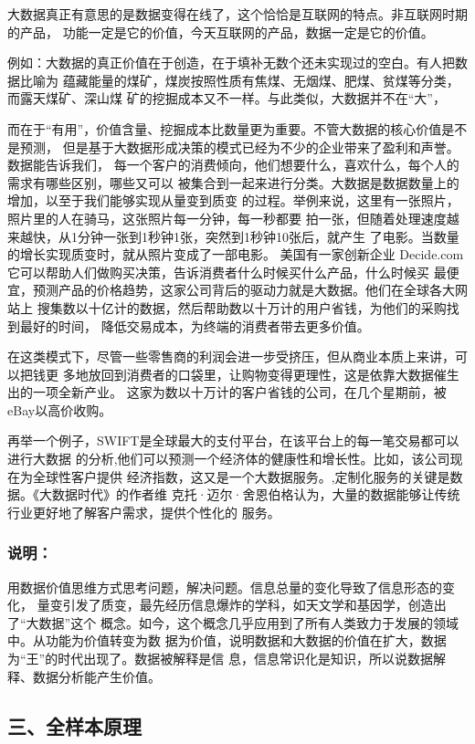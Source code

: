 \documentclass[11pt]{ctexart}
\begin{document}
{{{{大数据真正有意思的是数据变得在线了，这个恰恰是互联网的特点。非互联网时期的产品，
功能一定是它的价值，今天互联网的产品，数据一定是它的价值。

例如：大数据的真正价值在于创造，在于填补无数个还未实现过的空白。有人把数据比喻为
蕴藏能量的煤矿，煤炭按照性质有焦煤、无烟煤、肥煤、贫煤等分类，而露天煤矿、深山煤
矿的挖掘成本又不一样。与此类似，大数据并不在“大”，

而在于“有用”，价值含量、挖掘成本比数量更为重要。不管大数据的核心价值是不是预测，
但是基于大数据形成决策的模式已经为不少的企业带来了盈利和声誉。   数据能告诉我们，
每一个客户的消费倾向，他们想要什么，喜欢什么，每个人的需求有哪些区别，哪些又可以
被集合到一起来进行分类。大数据是数据数量上的增加，以至于我们能够实现从量变到质变
的过程。举例来说，这里有一张照片，照片里的人在骑马，这张照片每一分钟，每一秒都要
拍一张，但随着处理速度越来越快，从1分钟一张到1秒钟1张，突然到1秒钟10张后，就产生
了电影。当数量的增长实现质变时，就从照片变成了一部电影。   美国有一家创新企业
Decide.com   它可以帮助人们做购买决策，告诉消费者什么时候买什么产品，什么时候买
最便宜，预测产品的价格趋势，这家公司背后的驱动力就是大数据。他们在全球各大网站上
搜集数以十亿计的数据，然后帮助数以十万计的用户省钱，为他们的采购找到最好的时间，
降低交易成本，为终端的消费者带去更多价值。

在这类模式下，尽管一些零售商的利润会进一步受挤压，但从商业本质上来讲，可以把钱更
多地放回到消费者的口袋里，让购物变得更理性，这是依靠大数据催生出的一项全新产业。
这家为数以十万计的客户省钱的公司，在几个星期前，被eBay以高价收购。

再举一个例子，SWIFT是全球最大的支付平台，在该平台上的每一笔交易都可以进行大数据
的分析,他们可以预测一个经济体的健康性和增长性。比如，该公司现在为全球性客户提供
经济指数，这又是一个大数据服务。,定制化服务的关键是数据。《大数据时代》的作者维
克托·迈尔·舍恩伯格认为，大量的数据能够让传统行业更好地了解客户需求，提供个性化的
服务。

\subsubsection{说明：}
\label{sec:org978108b}
用数据价值思维方式思考问题，解决问题。信息总量的变化导致了信息形态的变化，
量变引发了质变，最先经历信息爆炸的学科，如天文学和基因学，创造出了“大数据”这个
概念。如今，这个概念几乎应用到了所有人类致力于发展的领域中。从功能为价值转变为数
据为价值，说明数据和大数据的价值在扩大，数据为“王”的时代出现了。数据被解释是信
息，信息常识化是知识，所以说数据解释、数据分析能产生价值。

\subsection{三、全样本原理}
\label{sec:orgd1d0c4e}

}}}}
\end{document}
